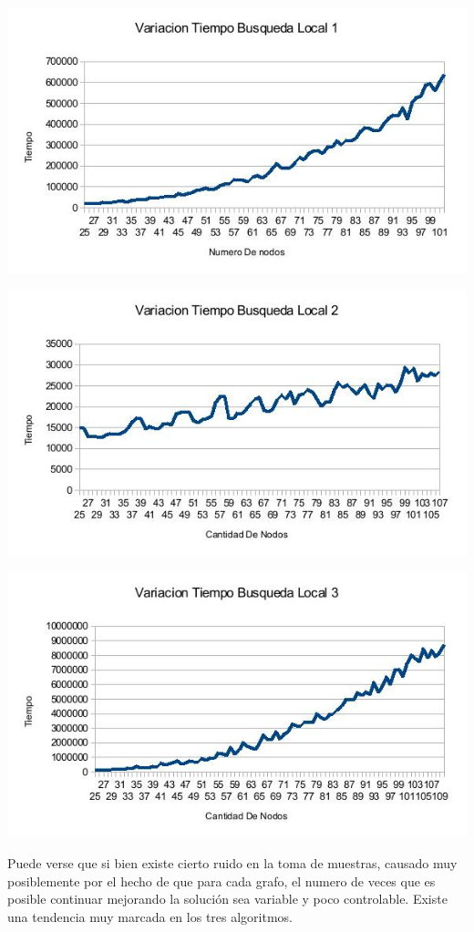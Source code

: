 \includegraphics[scale=0.5]{Ej4/tiempo1.jpg}

\includegraphics[scale=0.5]{Ej4/tiempo2.jpg}

\includegraphics[scale=0.5]{Ej4/tiempo3.jpg}

Puede verse que si bien existe cierto ruido en la toma de muestras, causado muy posiblemente por el hecho de que para cada grafo, el numero de veces que es posible continuar mejorando la solución sea variable y poco controlable. Existe una tendencia muy marcada en los tres algoritmos.


